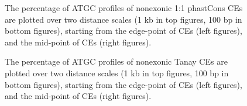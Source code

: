 \documentclass[12pt]{report}
\begin{document}
\begin{figure}[htbp]
\centering
{}
\caption{The percentage of ATGC profiles of nonexonic 1:1 phastCons CEs are plotted over two distance scales (1 kb in top figures, 100 bp in bottom figures), starting from the edge-point of CEs (left figures), and the mid-point of CEs (right figures).}
\label{fig:ATGC_1_1_phast}
\end{figure}

\begin{figure}[htbp]
\centering
{}
\caption{The percentage of ATGC profiles of nonexonic Tanay CEs are plotted over two distance scales (1 kb in top figures, 100 bp in bottom figures), starting from the edge-point of CEs (left figures), and the mid-point of CEs (right figures).}
\label{fig:ATGC_1_1_tan}
\end{figure}
\end{document}
